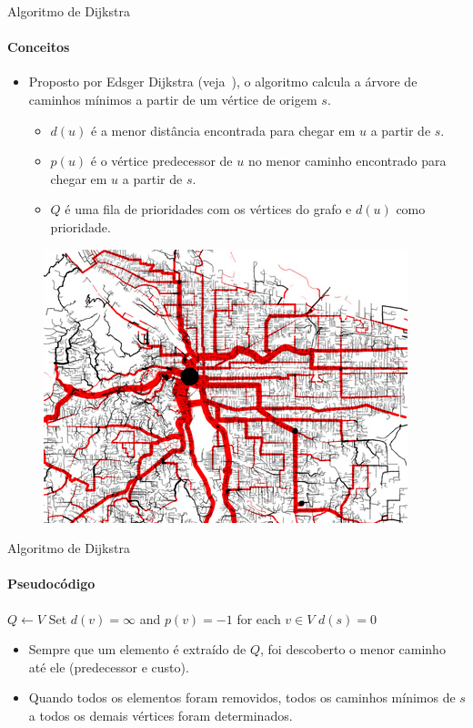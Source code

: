 \begin{frame}{Algoritmo de Dijkstra}
\framesubtitle{Conceitos}

\begin{itemize}
	\item Proposto por Edsger Dijkstra (veja~\cite{Dijkstra1959}), o algoritmo calcula a árvore de caminhos mínimos a partir de um vértice de origem $s$.
	\begin{itemize}
		\item $d(u)$ é a menor distância encontrada para chegar em $u$ a partir de $s$.
		
		\item $p(u)$ é o vértice predecessor de $u$ no menor caminho encontrado para chegar em $u$ a partir de $s$.
		
		\item $Q$ é uma fila de prioridades com os vértices do grafo e $d(u)$ como prioridade.
	\end{itemize}
\end{itemize}

\begin{figure}
	\centering
	\includegraphics[width=0.4\linewidth]{img/shortest-path-tree}
\end{figure}
\end{frame}



\begin{frame}{Algoritmo de Dijkstra}
\framesubtitle{Pseudocódigo}

\begin{algorithm}[H]
	\DontPrintSemicolon
	
	$Q \gets V$\;
	Set $d(v) = \infty$ and $p(v) = -1$ for each $v \in V$\;
	$d(s) = 0$\;
	
	
	\caption{\texttt{Dijkstra(Vertex s)}}
\end{algorithm}

\pause

\begin{itemize}
	\item Sempre que um elemento é extraído de $Q$, foi descoberto o menor caminho até ele (predecessor e custo).
	
	\item Quando todos os elementos foram removidos, todos os caminhos mínimos de $s$ a todos os demais vértices foram determinados.
\end{itemize}
\end{frame}



